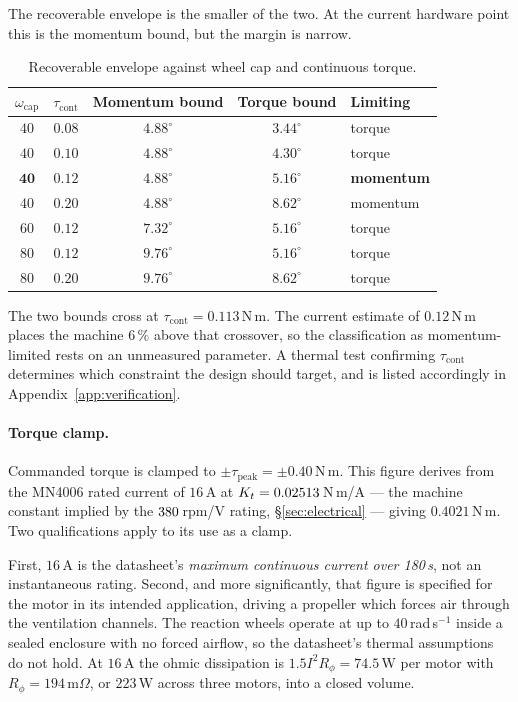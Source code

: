 The recoverable envelope is the smaller of the two. At the current hardware
point this is the momentum bound, but the margin is narrow.

\begin{table}[htbp]
\centering
\small
\begin{tabular}{@{}ccccl@{}}
\toprule
$\omega_{\mathrm{cap}}$ & $\tau_{\mathrm{cont}}$
& Momentum bound & Torque bound & Limiting\\
\midrule
$40$ & $0.08$ & $4.88^\circ$ & $3.44^\circ$ & torque\\
$40$ & $0.10$ & $4.88^\circ$ & $4.30^\circ$ & torque\\
$\bm{40}$ & $\bm{0.12}$ & $\bm{4.88^\circ}$ & $\bm{5.16^\circ}$ & \textbf{momentum}\\
$40$ & $0.20$ & $4.88^\circ$ & $8.62^\circ$ & momentum\\
$60$ & $0.12$ & $7.32^\circ$ & $5.16^\circ$ & torque\\
$80$ & $0.12$ & $9.76^\circ$ & $5.16^\circ$ & torque\\
$80$ & $0.20$ & $9.76^\circ$ & $8.62^\circ$ & torque\\
\bottomrule
\end{tabular}
\caption{Recoverable envelope against wheel cap and continuous torque.}
\label{tab:envelope-grid}
\end{table}

The two bounds cross at $\tau_{\mathrm{cont}} = 0.113$\,N\,m. The current
estimate of $0.12$\,N\,m places the machine $6\,\%$ above that crossover, so
the classification as momentum-limited rests on an unmeasured parameter. A
thermal test confirming $\tau_{\mathrm{cont}}$ determines which constraint
the design should target, and is listed accordingly in
Appendix~\ref{app:verification}.

\paragraph{Torque clamp.} Commanded torque is clamped to
$\pm\tau_{\mathrm{peak}} = \pm 0.40$\,N\,m. This figure derives from the
MN4006 rated current of $16$\,A at $K_t = 0.02513$\,N\,m/A --- the machine
constant implied by the $380$\,rpm/V rating, \S\ref{sec:electrical} ---
giving $0.4021$\,N\,m. Two qualifications apply to its use as a clamp.

First, $16$\,A is the datasheet's \emph{maximum continuous current over
180\,s}, not an instantaneous rating. Second, and more significantly, that
figure is specified for the motor in its intended application, driving a
propeller which forces air through the ventilation channels. The reaction
wheels operate at up to $40$\,rad\,s$^{-1}$ inside a sealed enclosure with no
forced airflow, so the datasheet's thermal assumptions do not hold. At $16$\,A
the ohmic dissipation is $1.5 I^2 R_\phi = 74.5$\,W per motor with
$R_\phi = 194$\,m$\Omega$, or $223$\,W across three motors, into a closed
volume.

